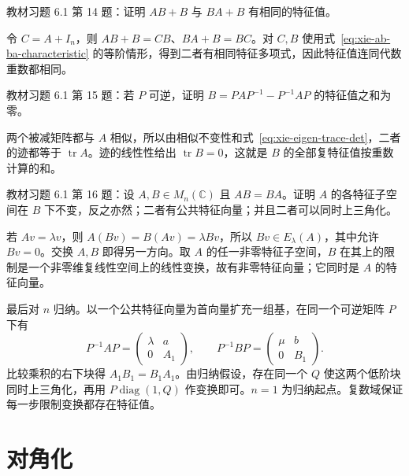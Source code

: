 \begin{example}
\label{ex:xie-61-14}
教材习题 6.1 第 14 题：证明 $AB+B$ 与 $BA+B$ 有相同的特征值。
\end{example}
\begin{solve}
令 $C=A+I_n$，则 $AB+B=CB$、$BA+B=BC$。对 $C,B$ 使用式~\eqref{eq:xie-ab-ba-characteristic} 的等阶情形，得到二者有相同特征多项式，因此特征值连同代数重数都相同。
\end{solve}

\begin{example}
\label{ex:xie-61-15}
教材习题 6.1 第 15 题：若 $P$ 可逆，证明 $B=PAP^{-1}-P^{-1}AP$ 的特征值之和为零。
\end{example}
\begin{solve}
两个被减矩阵都与 $A$ 相似，所以由相似不变性和式~\eqref{eq:xie-eigen-trace-det}，二者的迹都等于 $\operatorname{tr}A$。迹的线性性给出 $\operatorname{tr}B=0$，这就是 $B$ 的全部复特征值按重数计算的和。
\end{solve}

\begin{example}
\label{ex:xie-61-16}
教材习题 6.1 第 16 题：设 $A,B\in M_n(\mathbb C)$ 且 $AB=BA$。证明 $A$ 的各特征子空间在 $B$ 下不变，反之亦然；二者有公共特征向量；并且二者可以同时上三角化。
\end{example}
\begin{solve}
若 $Av=\lambda v$，则 $A(Bv)=B(Av)=\lambda Bv$，所以 $Bv\in E_\lambda(A)$，其中允许 $Bv=0$。交换 $A,B$ 即得另一方向。取 $A$ 的任一非零特征子空间，$B$ 在其上的限制是一个非零维复线性空间上的线性变换，故有非零特征向量；它同时是 $A$ 的特征向量。

最后对 $n$ 归纳。以一个公共特征向量为首向量扩充一组基，在同一个可逆矩阵 $P$ 下有
\[
 P^{-1}AP=\begin{pmatrix}\lambda&a\\0&A_1\end{pmatrix},\qquad
 P^{-1}BP=\begin{pmatrix}\mu&b\\0&B_1\end{pmatrix}.
\]
比较乘积的右下块得 $A_1B_1=B_1A_1$。由归纳假设，存在同一个 $Q$ 使这两个低阶块同时上三角化，再用 $P\operatorname{diag}(1,Q)$ 作变换即可。$n=1$ 为归纳起点。复数域保证每一步限制变换都存在特征值。
\end{solve}

\section{对角化}
\label{sec:xie-diagonalization}

